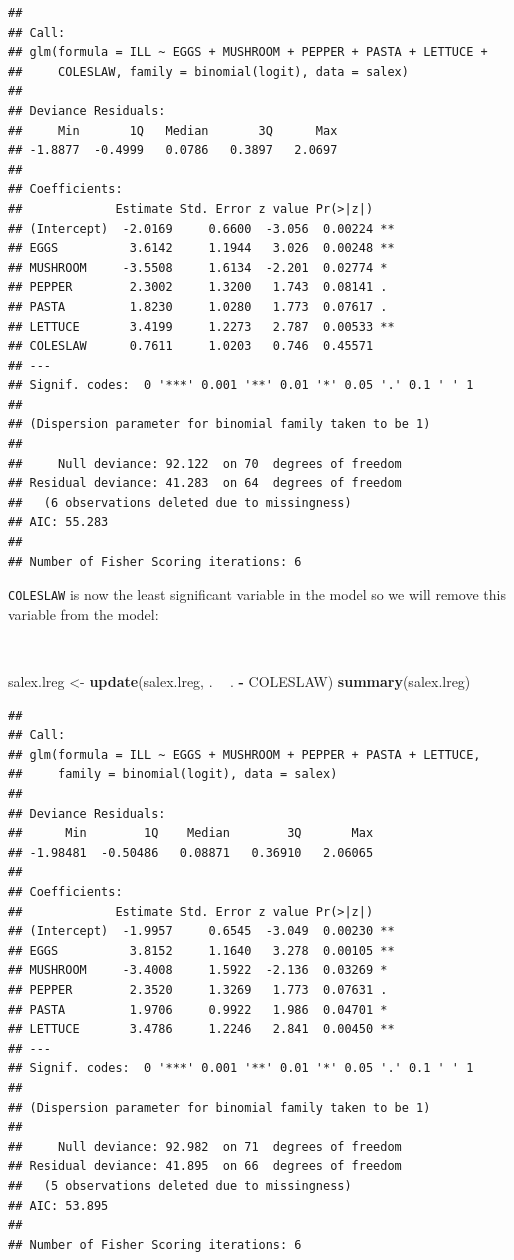 \documentclass[12pt,a4paper]{book}
\newenvironment{Shaded}{\begin{snugshade}}{\end{snugshade}}
\newcommand{\KeywordTok}[1]{\textcolor[rgb]{0.13,0.29,0.53}{\textbf{#1}}}
\newcommand{\StringTok}[1]{\textcolor[rgb]{0.31,0.60,0.02}{#1}}
\newcommand{\OperatorTok}[1]{\textcolor[rgb]{0.81,0.36,0.00}{\textbf{#1}}}
\newcommand{\NormalTok}[1]{#1}
\theoremstyle{definition}
\theoremstyle{definition}
\theoremstyle{definition}
\theoremstyle{remark}
\begin{document}
\begin{verbatim}
## 
## Call:
## glm(formula = ILL ~ EGGS + MUSHROOM + PEPPER + PASTA + LETTUCE + 
##     COLESLAW, family = binomial(logit), data = salex)
## 
## Deviance Residuals: 
##     Min       1Q   Median       3Q      Max  
## -1.8877  -0.4999   0.0786   0.3897   2.0697  
## 
## Coefficients:
##             Estimate Std. Error z value Pr(>|z|)   
## (Intercept)  -2.0169     0.6600  -3.056  0.00224 **
## EGGS          3.6142     1.1944   3.026  0.00248 **
## MUSHROOM     -3.5508     1.6134  -2.201  0.02774 * 
## PEPPER        2.3002     1.3200   1.743  0.08141 . 
## PASTA         1.8230     1.0280   1.773  0.07617 . 
## LETTUCE       3.4199     1.2273   2.787  0.00533 **
## COLESLAW      0.7611     1.0203   0.746  0.45571   
## ---
## Signif. codes:  0 '***' 0.001 '**' 0.01 '*' 0.05 '.' 0.1 ' ' 1
## 
## (Dispersion parameter for binomial family taken to be 1)
## 
##     Null deviance: 92.122  on 70  degrees of freedom
## Residual deviance: 41.283  on 64  degrees of freedom
##   (6 observations deleted due to missingness)
## AIC: 55.283
## 
## Number of Fisher Scoring iterations: 6
\end{verbatim}

\newpage

\texttt{COLESLAW} is now the least significant variable in the model so
we will remove this variable from the model:

~

\begin{Shaded}
\begin{Highlighting}[]
\NormalTok{salex.lreg <-}\StringTok{ }\KeywordTok{update}\NormalTok{(salex.lreg, . }\OperatorTok{~}\StringTok{ }\NormalTok{. }\OperatorTok{-}\StringTok{ }\NormalTok{COLESLAW)}
\KeywordTok{summary}\NormalTok{(salex.lreg)}
\end{Highlighting}
\end{Shaded}

\begin{verbatim}
## 
## Call:
## glm(formula = ILL ~ EGGS + MUSHROOM + PEPPER + PASTA + LETTUCE, 
##     family = binomial(logit), data = salex)
## 
## Deviance Residuals: 
##      Min        1Q    Median        3Q       Max  
## -1.98481  -0.50486   0.08871   0.36910   2.06065  
## 
## Coefficients:
##             Estimate Std. Error z value Pr(>|z|)   
## (Intercept)  -1.9957     0.6545  -3.049  0.00230 **
## EGGS          3.8152     1.1640   3.278  0.00105 **
## MUSHROOM     -3.4008     1.5922  -2.136  0.03269 * 
## PEPPER        2.3520     1.3269   1.773  0.07631 . 
## PASTA         1.9706     0.9922   1.986  0.04701 * 
## LETTUCE       3.4786     1.2246   2.841  0.00450 **
## ---
## Signif. codes:  0 '***' 0.001 '**' 0.01 '*' 0.05 '.' 0.1 ' ' 1
## 
## (Dispersion parameter for binomial family taken to be 1)
## 
##     Null deviance: 92.982  on 71  degrees of freedom
## Residual deviance: 41.895  on 66  degrees of freedom
##   (5 observations deleted due to missingness)
## AIC: 53.895
## 
## Number of Fisher Scoring iterations: 6
\end{verbatim}
\end{document}
